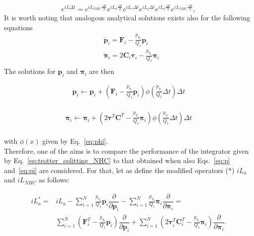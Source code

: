 \documentclass[aip,jcp,reprint,amsmath,amssymb]{revtex4-1}
\newcommand{\mt}[1]{\boldsymbol{\mathbf{#1}}}           %
\newcommand{\vt}[1]{\boldsymbol{\mathbf{#1}}}           %
\newcommand{\tr}[1]{#1^T}                               %
\newcommand{\diff}[2]{\dfrac{\partial #1}{\partial #2}} %
\begin{document}
\begin{equation}
\label{eq:trotter_splitting_NHC}
e^{i L \Delta t} =
e^{i L_{NHC} \frac{\Delta t}{2}} e^{i L_a \frac{\Delta t}{2}} e^{i L_r \Delta t} e^{i L_t \Delta t}  e^{i L_a \frac{\Delta t}{2}} e^{i L_{NHC} \frac{\Delta t}{2}},
\end{equation}
It is worth noting that analogous analytical solutions exists also for the following equations
\begin{align*}
&\dot{\vt p}_i = {\vt F}_i - \frac{p_{\eta_1}}{Q_1} \vt p_i  \\
&\dot{\vt \pi}_i = 2 \mt C_i \vt \tau_i - \frac{p_{\eta_1}}{Q_1} \vt \pi_i  \\
\end{align*}
The solutions for $\vt p_i$ and $\vt \pi_i $  are then

\begin{equation}
\label{eq:p}
\begin{split}
{\vt p}_i \leftarrow {\vt p}_i + \left({\vt F}_i - \frac{p_{\eta_1}}{Q_1} {\vt p}_i \right) \phi\left(\frac{p_{\eta_1}}{Q_1} \Delta t \right) \Delta t \\
\end{split}
\end{equation}

\begin{equation}
\label{eq:pi}
\begin{split}
{\vt \pi}_i \leftarrow {\vt \pi}_i + \left(2 \tr{\vt \tau} \tr{\mt C} - \frac{p_{\eta_1}}{Q_1} {\vt \pi}_i \right) \phi\left(\frac{p_{\eta_1}}{Q_1} \Delta t \right) \Delta t \\
\end{split}
\end{equation}

with $\phi(x)$ given by Eq.~\ref{eq:phi}.
\\

Therefore, one of the aims is to compare the performance of the integrator given by Eq.~\ref{eq:trotter_splitting_NHC} to that obtained when also Eqs.~\ref{eq:p} and~\ref{eq:pi} are considered. For that, let as define the modified operators ($\ast$) $ i L_a $ and $ i L_{NHC} $ as follows:

\begin{equation}
\begin{split}
i L^\ast_a = &i L_a -\sum_{i=1}^{N}\frac{p_{\eta_1}}{Q_1}\vt p_i\diff{}{\vt p_i} - \sum_{i=1}^{N}\frac{p_{\eta_1}}{Q_1}\vt \pi_i  \diff{}{\vt \pi_i} =\\
             &\sum_{i=1}^{N}(\tr{\vt F_i} - \frac{p_{\eta_1}}{Q_1}\vt p_i) \diff{}{\vt p_i} + \sum_{i=1}^{N}(2 \tr{\vt \tau_i} \tr{\mt C_i} -  \frac{p_{\eta_1}}{Q_1}\vt \pi_i)  \diff{}{\vt \pi_i}.
\end{split}
\end{equation}
\end{document}
